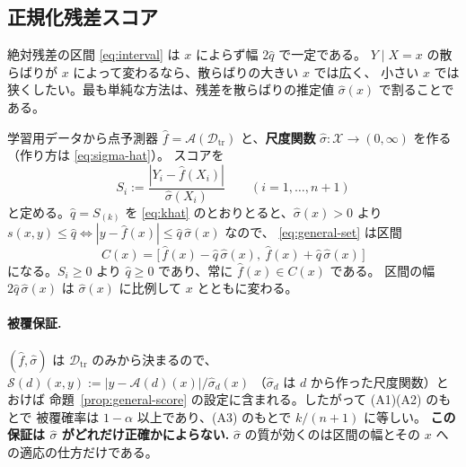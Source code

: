 \documentclass[a4paper,11pt]{jsarticle}
\theoremstyle{definition}
\theoremstyle{plain}
\theoremstyle{remark}
\newcommand{\Dtr}{\mathcal{D}_{\mathrm{tr}}}     %
\newcommand{\qhat}{\hat{q}}
\newcommand{\fhat}{\hat{f}}
\begin{document}
\subsection{正規化残差スコア}
\label{sec:normalized-score}

絶対残差の区間 \eqref{eq:interval} は $x$ によらず幅 $2\qhat$ で一定である。
$Y\mid X=x$ の散らばりが $x$ によって変わるなら、散らばりの大きい $x$ では広く、
小さい $x$ では狭くしたい。最も単純な方法は、残差を散らばりの推定値
$\hat\sigma(x)$ で割ることである。

学習用データから点予測器 $\fhat=\mathcal{A}(\Dtr)$ と、\textbf{尺度関数}
$\hat\sigma\colon\mathcal{X}\to(0,\infty)$ を作る（作り方は \eqref{eq:sigma-hat}）。
スコアを
\begin{equation}
  \label{eq:score-normalized}
  S_i:=\frac{|Y_i-\fhat(X_i)|}{\hat\sigma(X_i)}\qquad(i=1,\dots,n+1)
\end{equation}
と定める。$\qhat=S_{(k)}$ を \eqref{eq:khat} のとおりとると、$\hat\sigma(x)>0$ より
$s(x,y)\le\qhat\iff|y-\fhat(x)|\le\qhat\,\hat\sigma(x)$ なので、
\eqref{eq:general-set} は区間
\begin{equation}
  \label{eq:interval-normalized}
  C(x)=\bigl[\,\fhat(x)-\qhat\,\hat\sigma(x),\ \fhat(x)+\qhat\,\hat\sigma(x)\,\bigr]
\end{equation}
になる。$S_i\ge0$ より $\qhat\ge0$ であり、常に $\fhat(x)\in C(x)$ である。
区間の幅 $2\qhat\,\hat\sigma(x)$ は $\hat\sigma(x)$ に比例して $x$ とともに変わる。

\paragraph{被覆保証.}
$(\fhat,\hat\sigma)$ は $\Dtr$ のみから決まるので、
$\mathcal{S}(d)(x,y):=|y-\mathcal{A}(d)(x)|/\hat\sigma_d(x)$
（$\hat\sigma_d$ は $d$ から作った尺度関数）とおけば
命題~\ref{prop:general-score} の設定に含まれる。したがって (A1)(A2) のもとで
被覆確率は $1-\alpha$ 以上であり、(A3) のもとで $k/(n+1)$ に等しい。
\textbf{この保証は $\hat\sigma$ がどれだけ正確かによらない.}
$\hat\sigma$ の質が効くのは区間の幅とその $x$ への適応の仕方だけである。
\end{document}
